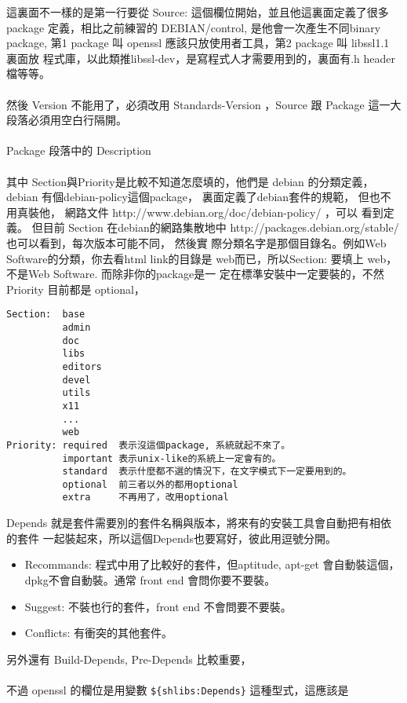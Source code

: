   這裏面不一樣的是第一行要從 Source: 這個欄位開始，並且他這裏面定義了很多
  package 定義，相比之前練習的 DEBIAN/control, 是他會一次產生不同binary package,
  第1 package 叫 openssl 應該只放使用者工具，第2 package 叫 libssl1.1 裏面放
  程式庫，以此類推libssl-dev，是寫程式人才需要用到的，裏面有.h header檔等等。
  \\\\
  然後 Version 不能用了，必須改用 Standards-Version ，Source 跟 Package
  這一大段落必須用空白行隔開。
  \\\\
  Package 段落中的 Description
  \\\\
  其中 Section與Priority是比較不知道怎麼填的，他們是 debian 的分類定義，
  debian 有個debian-policy這個package， 裏面定義了debian套件的規範，
  但也不用真裝他， 網路文件 http://www.debian.org/doc/debian-policy/ ，可以
  看到定義。 但目前 Section 在debian的網路集散地中 
  http://packages.debian.org/stable/ 也可以看到，每次版本可能不同， 然後實
  際分類名字是那個目錄名。例如Web Software的分類，你去看html link的目錄是
  web而已，所以Section: 要填上 web，不是Web Software. 而除非你的package是一
  定在標準安裝中一定要裝的，不然 Priority 目前都是 optional，
  \begin{verbatim}
Section:  base
          admin
          doc
          libs
          editors
          devel
          utils
          x11
          ...
          web
Priority: required  表示沒這個package, 系統就起不來了。
          important 表示unix-like的系統上一定會有的。
          standard  表示什麼都不選的情況下，在文字模式下一定要用到的。
          optional  前三者以外的都用optional
          extra     不再用了，改用optional
  \end{verbatim}
  Depends 就是套件需要別的套件名稱與版本，將來有的安裝工具會自動把有相依的套件
  一起裝起來，所以這個Depends也要寫好，彼此用逗號分開。
  \begin{itemize}
    \item Recommands: 程式中用了比較好的套件，但aptitude, apt-get 會自動裝這個，
      dpkg不會自動裝。通常 front end 會問你要不要裝。
    \item Suggest: 不裝也行的套件，front end 不會問要不要裝。
    \item Conflicts: 有衝突的其他套件。
  \end{itemize}
  另外還有 Build-Depends, Pre-Depends 比較重要，
  \\\\
  不過 openssl 的欄位是用變數 \verb=${shlibs:Depends}= 這種型式，這應該是

